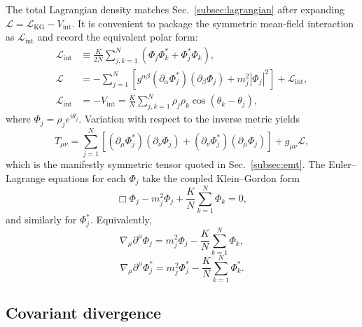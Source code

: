 The total Lagrangian density matches Sec.~\ref{subsec:lagrangian} after expanding $\mathcal{L}=\mathcal{L}_{\mathrm{KG}}-V_{\mathrm{int}}$.
It is convenient to package the symmetric mean-field interaction as $\mathcal{L}_{\mathrm{int}}$ and record the equivalent polar form:
\begin{equation}
\begin{aligned}
\mathcal{L}_{\mathrm{int}}
&\equiv\frac{K}{2N}\sum_{j,k=1}^N\left(\Phi_j\Phi_k^*+\Phi_j^*\Phi_k\right) ,\\
\mathcal{L}
&=-\sum_{j=1}^N\left[g^{\alpha\beta}(\partial_\alpha\Phi_j^*)(\partial_\beta\Phi_j)+m_j^2|\Phi_j|^2\right]
+\mathcal{L}_{\mathrm{int}} ,\\
\mathcal{L}_{\mathrm{int}}
&=-V_{\mathrm{int}}
=\frac{K}{N}\sum_{j,k=1}^N\rho_j\rho_k\cos(\theta_k-\theta_j) ,
\end{aligned}
\label{eq:lagrangian_app_block}
\end{equation}
where $\Phi_j=\rho_j e^{i\theta_j}$.
Variation with respect to the inverse metric yields
\begin{equation}
T_{\mu\nu}
=\sum_{j=1}^N\left[(\partial_\mu\Phi_j^*)(\partial_\nu\Phi_j)+(\partial_\nu\Phi_j^*)(\partial_\mu\Phi_j)\right]
+g_{\mu\nu}\mathcal{L} ,
\label{eq:Tmunu_explicit}
\end{equation}
which is the manifestly symmetric tensor quoted in Sec.~\ref{subsec:emt}.
The Euler--Lagrange equations for each $\Phi_j$ take the coupled Klein--Gordon form
\begin{equation}
\Box\Phi_j-m_j^2\Phi_j+\frac{K}{N}\sum_{k=1}^N\Phi_k=0 ,
\label{eq:EOM_app}
\end{equation}
and similarly for $\Phi_j^*$.
Equivalently,
\begin{equation}
\nabla_\mu\partial^\mu\Phi_j=m_j^2\Phi_j-\frac{K}{N}\sum_{k=1}^N\Phi_k ,
\label{eq:box_phi}
\end{equation}
\begin{equation}
\nabla_\mu\partial^\mu\Phi_j^*=m_j^2\Phi_j^*-\frac{K}{N}\sum_{k=1}^N\Phi_k^* .
\label{eq:box_phi_star}
\end{equation}

\subsection{Covariant divergence}


